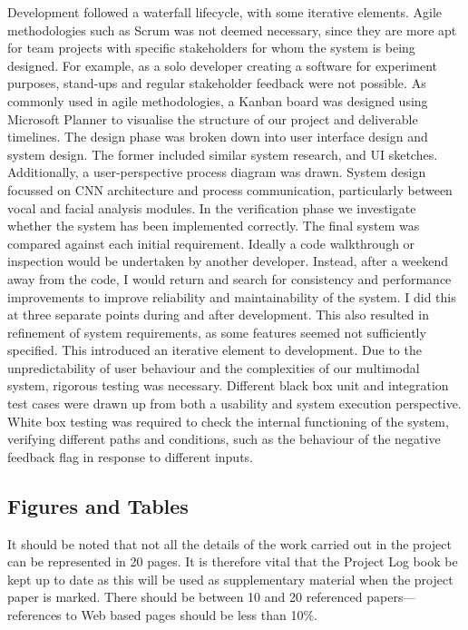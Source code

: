 \documentclass[12pt,a4paper]{article}
\begin{document}
Development followed a waterfall lifecycle, with some iterative elements. Agile methodologies such as Scrum was not deemed necessary, since they are more apt for team projects with specific stakeholders for whom the system is being designed. For example, as a solo developer creating a software for experiment purposes, stand-ups and regular stakeholder feedback were not possible. As commonly used in agile methodologies, a Kanban board was designed using Microsoft Planner to visualise the structure of our project and deliverable timelines. The design phase was broken down into user interface design and system design. The former included similar system research, and UI sketches. Additionally, a user-perspective process diagram was drawn. System design focussed on CNN architecture and process communication, particularly between vocal and facial analysis modules. In the verification phase we investigate whether the system has been implemented correctly. The final system was compared against each initial requirement. Ideally a code walkthrough or inspection would be undertaken by another developer. Instead, after a weekend away from the code, I would return and search for consistency and performance improvements to improve reliability and maintainability of the system. I did this at three separate points during and after development. This also resulted in refinement of system requirements, as some features seemed not sufficiently specified. This introduced an iterative element to development. Due to the unpredictability of user behaviour and the complexities of our multimodal system, rigorous testing was necessary. Different black box unit and integration test cases were drawn up from both a usability and system execution perspective. White box testing was required to check the internal functioning of the system, verifying different paths and conditions, such as the behaviour of the negative feedback flag in response to different inputs.


\subsection{Figures and Tables}
It should be noted that not all the details of the work carried out in the project can be represented in 20 pages.  It is therefore vital that the Project Log book be kept up to date as this will be used as supplementary material when the project paper is marked.  There should be between 10 and 20 referenced papers---references to Web based pages should be less than 10\%.
\end{document}
